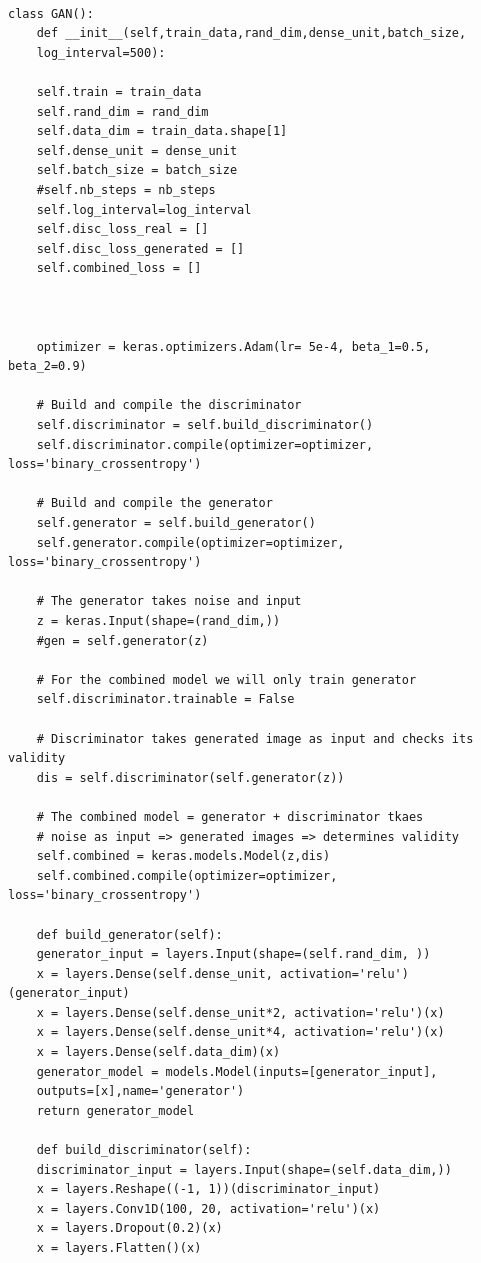\begin{lstlisting}[backgroundcolor = \color{white}]

class GAN():
	def __init__(self,train_data,rand_dim,dense_unit,batch_size,
	log_interval=500):

	self.train = train_data
	self.rand_dim = rand_dim
	self.data_dim = train_data.shape[1]
	self.dense_unit = dense_unit 
	self.batch_size = batch_size
	#self.nb_steps = nb_steps
	self.log_interval=log_interval
	self.disc_loss_real = []
	self.disc_loss_generated = []
	self.combined_loss = []
	
	
	
	optimizer = keras.optimizers.Adam(lr= 5e-4, beta_1=0.5, beta_2=0.9)
	
	# Build and compile the discriminator
	self.discriminator = self.build_discriminator()
	self.discriminator.compile(optimizer=optimizer, loss='binary_crossentropy')
	
	# Build and compile the generator
	self.generator = self.build_generator()
	self.generator.compile(optimizer=optimizer, loss='binary_crossentropy')
	
	# The generator takes noise and input
	z = keras.Input(shape=(rand_dim,))
	#gen = self.generator(z)
	
	# For the combined model we will only train generator
	self.discriminator.trainable = False
	
	# Discriminator takes generated image as input and checks its validity
	dis = self.discriminator(self.generator(z))
	
	# The combined model = generator + discriminator tkaes
	# noise as input => generated images => determines validity
	self.combined = keras.models.Model(z,dis)
	self.combined.compile(optimizer=optimizer, loss='binary_crossentropy')
	
	def build_generator(self):
	generator_input = layers.Input(shape=(self.rand_dim, ))
	x = layers.Dense(self.dense_unit, activation='relu')(generator_input)
	x = layers.Dense(self.dense_unit*2, activation='relu')(x)
	x = layers.Dense(self.dense_unit*4, activation='relu')(x)
	x = layers.Dense(self.data_dim)(x)    
	generator_model = models.Model(inputs=[generator_input],
	outputs=[x],name='generator')
	return generator_model
	
	def build_discriminator(self):
	discriminator_input = layers.Input(shape=(self.data_dim,))
	x = layers.Reshape((-1, 1))(discriminator_input)
	x = layers.Conv1D(100, 20, activation='relu')(x)
	x = layers.Dropout(0.2)(x)
	x = layers.Flatten()(x)
	

\end{lstlisting}
